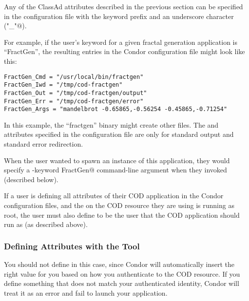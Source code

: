 Any of the ClassAd attributes described in the previous section can be
specified in the configuration file with the keyword prefix and an
underscore character (\verb@"_"@).

For example, if the user's keyword for a given fractal generation
application is ``FractGen'', the resulting entries in the Condor
configuration file might look like this:

\begin{verbatim}
FractGen_Cmd = "/usr/local/bin/fractgen"
FractGen_Iwd = "/tmp/cod-fractgen"
FractGen_Out = "/tmp/cod-fractgen/output"
FractGen_Err = "/tmp/cod-fractgen/error"
FractGen_Args = "mandelbrot -0.65865,-0.56254 -0.45865,-0.71254"
\end{verbatim}

In this example, the ``fractgen'' binary might create other files.
The  and  attributes specified in the
configuration file are only for standard output and standard error
redirection.

When the user wanted to spawn an instance of this application, they
would specify a \verb@-keyword FractGen@ command-line argument when
they invoked  (described below).

\Note If a user is defining all attributes of their COD application in
the Condor configuration files, and the  on the COD
resource they are using is running as root, the user must also define
 to be the user that the COD application should run as (as
described above).


\subsubsection{\label{sec:cod-command-line-attrs}
Defining Attributes with the  Tool} 

\Todo

\Note You should not define  in this case, since Condor
will automatically insert the right value for you based on how you
authenticate to the COD resource.  
If you define something that does not match your authenticated
identity, Condor will treat it as an error and fail to launch your
application. 


